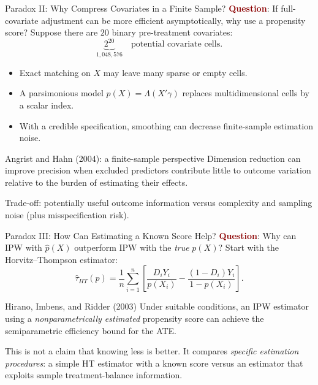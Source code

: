 \documentclass[aspectratio=169,11pt]{beamer}
\newcommand{\Question}{\textcolor{DarkRed}{\textbf{Question}}}
\begin{document}
\begin{frame}{Paradox II: Why Compress Covariates in a Finite Sample?}
\small
\Question: If full-covariate adjustment can be more efficient asymptotically, why use a propensity score?
\medskip
Suppose there are \(20\) binary pre-treatment covariates:
\[
\underbrace{2^{20}}_{1{,}048{,}576}\quad\text{potential covariate cells}.
\]
\begin{itemize}
\item Exact matching on \(X\) may leave many sparse or empty cells.
\item A parsimonious model \(p(X)=\Lambda(X'\gamma)\) replaces multidimensional cells by a scalar index.
\item With a credible specification, smoothing can decrease finite-sample estimation noise.
\end{itemize}
\begin{block}{Angrist and Hahn (2004): a finite-sample perspective}
Dimension reduction can improve precision when excluded predictors contribute little to outcome variation relative to the burden of estimating their effects.
\end{block}
\alert{Trade-off:} potentially useful outcome information versus complexity and sampling noise (plus misspecification risk).
\end{frame}

\begin{frame}{Paradox III: How Can Estimating a Known Score Help?}
\small
\Question: Why can IPW with \(\hat p(X)\) outperform IPW with the \emph{true} \(p(X)\)?
\medskip
Start with the Horvitz--Thompson estimator:
\[
\hat\tau_{HT}(p)=\frac1n\sum_{i=1}^n\left[\frac{D_iY_i}{p(X_i)}-\frac{(1-D_i)Y_i}{1-p(X_i)}\right].
\]
\begin{block}{Hirano, Imbens, and Ridder (2003)}
Under suitable conditions, an IPW estimator using a \emph{nonparametrically estimated} propensity score can achieve the semiparametric efficiency bound for the ATE.
\end{block}
\medskip
This is \alert{not} a claim that knowing less is better. It compares \emph{specific estimation procedures}: a simple HT estimator with a known score versus an estimator that exploits sample treatment-balance information.
\end{frame}
\end{document}
